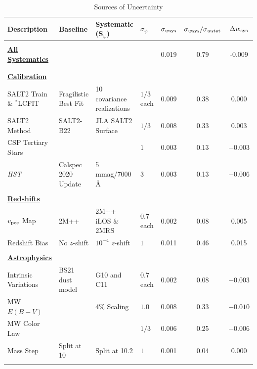 \begin{table}
\centering
\caption{Sources of Uncertainty}
\begin{tabular}{llllccc}
\toprule

Description & Baseline  & Systematic (S$_\psi$) & $\sigma_\psi$ &  $\sigma_{w{\rm sys}}$&$\sigma_{w{\rm sys}}/\sigma_{w{\rm stat}}$&$\Delta w_{\rm sys}$ \\%
\hline \\

\textbf{\ul{All Systematics}}&&&&0.019&0.79&-0.009\\
\\
\hline \\

\textbf{\ul{Calibration}}\\ %

SALT2 Train \& $^*$LCFIT  & Fragilistic Best Fit & 10 covariance realizations & $1/3$ each&0.009&0.38&0.000\\
SALT2 Method & SALT2-B22 & JLA SALT2 Surface & $1/3$ & 0.008&0.33&0.003\\
CSP Tertiary Stars       & \cite{krisciunis17} &  \cite{Stritzinger2018} & $1$ & 0.003&0.13&$-0.003$\\
{\it HST} & Calspec 2020 Update &  5\,mmag/7000\,\AA & $3$ & 0.003&0.13 &$-0.006$ \\
\\

\textbf{\ul{Redshifts}}\\
$v_{\rm pec}$ Map & 2M++ & 2M++ iLOS \& 2MRS & $0.7$ each &0.002&0.08&0.005\\
Redshift Bias & No $z$-shift & $10^{-4}$ $z$-shift & $1$&0.011&0.46&0.015\\
\\

\textbf{\ul{Astrophysics}}\\

Intrinsic Variations & BS21 dust model &  G10 and C11 & $0.7$ each & 0.002&0.08&$-0.003$ \\
MW $E(B-V)$ & \cite{Schlafly11} & 4\% Scaling & $1.0$ & 0.008&0.33 & $-0.010$\\
MW Color Law & \cite{Fitzpatrick99} & \cite{ccm} & $1/3$ & 0.006&0.25&$-0.006$\\
Mass Step & Split at 10 & Split at 10.2 & $1$ & 0.001&0.04 & 0.000\\
\\


\end{tabular}
\end{table}

